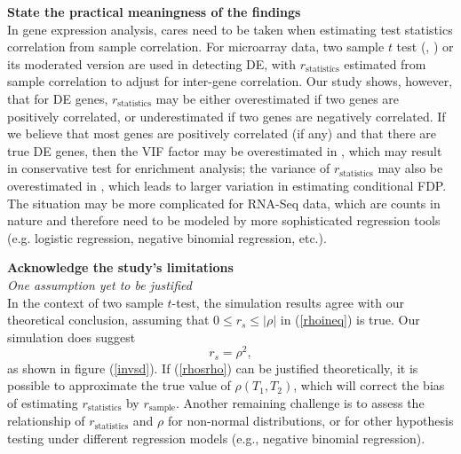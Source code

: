 \documentclass[12pt, a4paper]{article}
\begin{document}
	\textbf{State the practical meaningness of the findings}\\
	In gene expression analysis, cares need to be taken when estimating test statistics correlation from
	sample correlation. For microarray data, two sample $t$ test (\cite{efron2007correlation},
	\cite{barry2008statistical}) or its moderated version \citep{wu2012camera} are used in detecting DE,
	with $r_\text{statistics}$  estimated from sample correlation to adjust for inter-gene correlation.
	Our study shows, however, that for DE genes, $r_\text{statistics}$ may be either overestimated if
	two genes are positively correlated, or underestimated if two genes are negatively correlated. If we
	believe that most genes are positively correlated (if any) and that there are true DE genes, then
	the VIF factor may be overestimated in \cite{wu2012camera}, which may result in conservative test
	for enrichment analysis; the variance of  $r_\text{statistics}$ may also be overestimated in
	\cite{efron2007correlation}, which leads to larger variation in estimating conditional FDP. The
	situation may be more complicated for RNA-Seq data, which are counts in nature and therefore need to
	be modeled by more sophisticated regression tools (e.g. logistic regression, negative binomial
	regression, etc.). 
	
	\textbf{	Acknowledge the study’s limitations \\}
	\textit{One assumption yet to be justified}\\
	In the context of two sample $t$-test, the simulation results agree with our theoretical
	conclusion, assuming that  $0\leq r_s \leq |\rho|$ in (\ref{rhoineq}) is true. Our simulation does
	suggest 
	\begin{equation}\label{rhosrho}
		r_s = \rho^2, 
	\end{equation}
	as shown in figure (\ref{invsd}). If (\ref{rhosrho}) can be justified theoretically, it is possible
	to approximate the true value of $\rho(T_1, T_2)$, which will correct the bias of estimating
	$r_\text{statistics}$ by $r_\text{sample}$. Another remaining challenge is to assess the
	relationship of $r_\text{statistics}$  and $\rho$ for non-normal distributions, or for other
	hypothesis testing under different regression models (e.g., negative binomial regression).  
	
	
	
	\newpage
\end{document}
